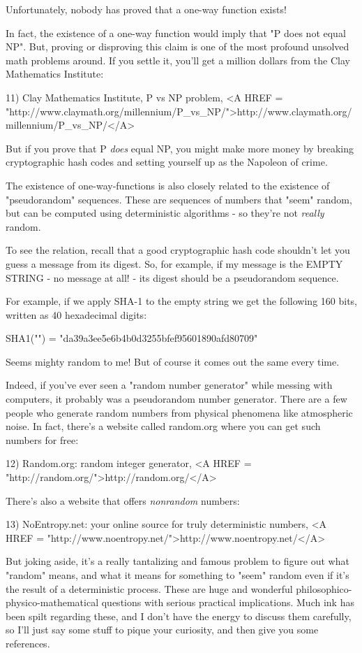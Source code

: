 Unfortunately, nobody has proved that a one-way function exists!

In fact, the existence of a one-way function would imply that 
"P does not equal NP".  But, proving or disproving this claim is one 
of the most profound unsolved math problems around.  If you settle it, 
you'll get a million dollars from the Clay Mathematics Institute:

11) Clay Mathematics Institute, P vs NP problem, 
<A HREF = "http://www.claymath.org/millennium/P_vs_NP/">http://www.claymath.org/millennium/P_vs_NP/</A>

But if you prove that P \emph{does} equal NP, you might make more money by 
breaking cryptographic hash codes and setting yourself up as the Napoleon 
of crime. 

The existence of one-way-functions is also closely related to the 
existence of "pseudorandom" sequences.  These are sequences of 
numbers that "seem" random, but can be computed using deterministic 
algorithms - so they're not \emph{really} random.  

To see the relation, recall that a good cryptographic hash code
shouldn't let you guess a message from its digest.  So, for example,
if my message is the EMPTY STRING - no message at all! - its digest
should be a pseudorandom sequence.  

For example, if we apply SHA-1 to the empty string we get the
following 160 bits, written as 40 hexadecimal digits:

SHA1("") = "da39a3ee5e6b4b0d3255bfef95601890afd80709"

Seems mighty random to me!  But of course it comes out the same every time.  

Indeed, if you've ever seen a "random number generator" while messing 
with computers, it probably was a pseudorandom number generator.  There 
are a few people who generate random numbers from physical phenomena
like atmospheric noise.  In fact, there's a website called random.org 
where you can get such numbers for free:

12) Random.org: random integer generator, <A HREF = "http://random.org/">http://random.org/</A>

There's also a website that offers \emph{nonrandom} numbers:

13) NoEntropy.net: your online source for truly deterministic numbers,
<A HREF = "http://www.noentropy.net/">http://www.noentropy.net/</A>

But joking aside, it's a really tantalizing and famous problem to figure 
out what "random" means, and what it means for something to "seem" 
random even if it's the result of a deterministic process.  These are 
huge and wonderful philosophico-physico-mathematical questions with 
serious practical implications.  Much ink has been spilt regarding these,
and I don't have the energy to discuss them carefully, so I'll just 
say some stuff to pique your curiosity, and then give you some references.


